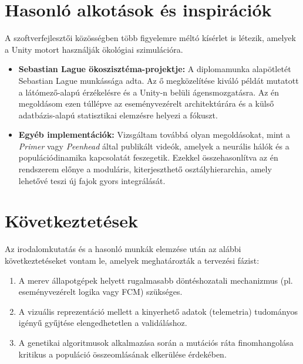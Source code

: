 \section{Hasonló alkotások és inspirációk}

A szoftverfejlesztői közösségben több figyelemre méltó kísérlet is létezik, amelyek a Unity motort használják ökológiai szimulációra.

\begin{itemize}
    \item \textbf{Sebastian Lague ökoszisztéma-projektje:} A diplomamunka alapötletét Sebastian Lague munkássága adta. Az ő megközelítése kiváló példát mutatott a látómező-alapú érzékelésre és a Unity-n belüli ágensmozgatásra. Az én megoldásom ezen túllépve az eseményvezérelt architektúrára és a külső adatbázis-alapú statisztikai elemzésre helyezi a fókuszt.
    
    \item \textbf{Egyéb implementációk:} Vizsgáltam továbbá olyan megoldásokat, mint a \textit{Primer} vagy \textit{Peenhead} által publikált videók, amelyek a neurális hálók és a populációdinamika kapcsolatát feszegetik. Ezekkel összehasonlítva az én rendszerem előnye a moduláris, kiterjeszthető osztályhierarchia, amely lehetővé teszi új fajok gyors integrálását.
\end{itemize}

\section{Következtetések}

Az irodalomkutatás és a hasonló munkák elemzése után az alábbi következtetéseket vontam le, amelyek meghatározták a tervezési fázist:
\begin{enumerate}
    \item A merev állapotgépek helyett rugalmasabb döntéshozatali mechanizmus (pl. eseményvezérelt logika vagy FCM) szükséges.
    \item A vizuális reprezentáció mellett a kinyerhető adatok (telemetria) tudományos igényű gyűjtése elengedhetetlen a validáláshoz.
    \item A genetikai algoritmusok alkalmazása során a mutációs ráta finomhangolása kritikus a populáció összeomlásának elkerülése érdekében.
\end{enumerate}